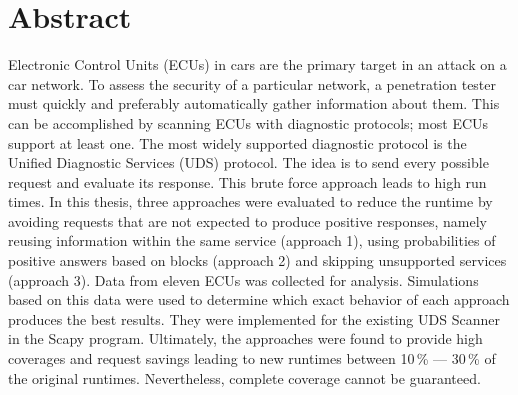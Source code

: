 \chapter*{\centering Abstract}

Electronic Control Units (ECUs) in cars are the primary target in an attack on a car network. To assess the security of a particular network, a penetration tester must quickly and preferably automatically gather information about them. This can be accomplished by scanning ECUs with diagnostic protocols; most ECUs support at least one. The most widely supported diagnostic protocol is the Unified Diagnostic Services (UDS) protocol. The idea is to send every possible request and evaluate its response. This brute force approach leads to high run times. In this thesis, three approaches were evaluated to reduce the runtime by avoiding requests that are not expected to produce positive responses, namely reusing information within the same service (approach 1), using probabilities of positive answers based on blocks (approach 2) and skipping unsupported services (approach 3). Data from eleven ECUs was collected for analysis. Simulations based on this data were used to determine which exact behavior of each approach produces the best results. They were implemented for the existing UDS Scanner in the Scapy program. Ultimately, the approaches were found to provide high coverages and request savings leading to new runtimes between 10\,\% — 30\,\% of the original runtimes. Nevertheless, complete coverage cannot be guaranteed.
